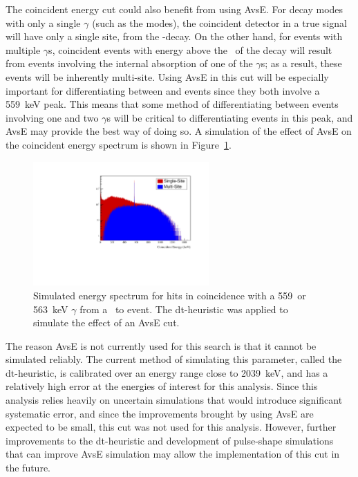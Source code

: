 \documentclass[/main.tex]{subfiles}
\begin{document}
The coincident energy cut could also benefit from using AvsE.
For decay modes with only a single $\gamma$ (such as the  modes), the coincident detector in a true signal will have only a single site, from the \bb -decay.
On the other hand, for events with multiple $\gamma$s, coincident events with energy above the \Qval\ of the decay will result from events involving the internal absorption of one of the $\gamma$s; as a result, these events will be inherently multi-site.
Using AvsE in this cut will be especially important for differentiating between  and  events since they both involve a 559~keV peak.
This means that some method of differentiating between events involving one and two $\gamma$s will be critical to differentiating events in this peak, and AvsE may provide the best way of doing so.
A simulation of the effect of AvsE on the coincident energy spectrum is shown in Figure~\ref{fig:coincavse}.
\begin{figure}[tb]
  \centering
  \includegraphics[width=0.6\textwidth]{coincidentcutwithavse}
  \caption[Coincident energy spectrum with multi-site event cut]{\label{fig:coincavse}
    Simulated energy spectrum for hits in coincidence with a 559~or 563~keV $\gamma$ from a \tnbb\ to  event. The dt-heuristic was applied to simulate the effect of an AvsE cut.
  }
\end{figure}
The reason AvsE is not currently used for this search is that it cannot be simulated reliably.
The current method of simulating this parameter, called the dt-heuristic, is calibrated over an energy range close to 2039~keV, and has a relatively high error at the energies of interest for this analysis.
Since this analysis relies heavily on uncertain simulations that would introduce significant systematic error, and since the improvements brought by using AvsE are expected to be small, this cut was not used for this analysis.
However, further improvements to the dt-heuristic and development of pulse-shape simulations that can improve AvsE simulation may allow the implementation of this cut in the future.
\end{document}
